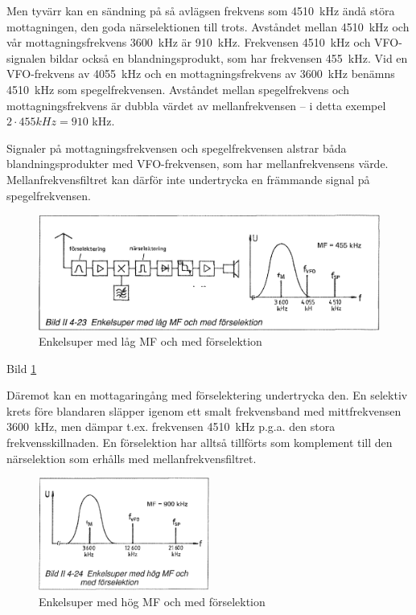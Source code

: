 Men tyvärr kan en sändning på så avlägsen frekvens som 4510~kHz ändå
störa mottagningen, den goda närselektionen till trots. Avståndet
mellan 4510~kHz och vår mottagningsfrekvens 3600~kHz är 910~kHz.
Frekvensen 4510~kHz och VFO-signalen bildar också en
blandningsprodukt, som har frekvensen 455~kHz. Vid en VFO-frekvens av
4055~kHz och en mottagningsfrekvens av 3600~kHz benämns 4510~kHz som
spegelfrekvensen. Avståndet mellan spegelfrekvens och
mottagningsfrekvens är dubbla värdet av mellanfrekvensen -- i detta
exempel \(2 \cdot 455kHz = 910\) kHz.

Signaler på mottagningsfrekvensen och spegelfrekvensen alstrar båda
blandningsprodukter med VFO-frekvensen, som har mellanfrekvensens
värde. Mellanfrekvensfiltret kan därför inte undertrycka en främmande
signal på spegelfrekvensen.

\begin{figure}
  \includegraphics[width=\textwidth]{images/bild_2_4-23}
  \caption{Enkelsuper med låg MF och med förselektion}
  \label{fig:bildII4-23}
\end{figure}

Bild \ref{fig:bildII4-23}

Däremot kan en mottagaringång med förselektering undertrycka den. En
selektiv krets före blandaren släpper igenom ett smalt frekvensband
med mittfrekvensen 3600~kHz, men dämpar t.ex. frekvensen 4510~kHz
p.g.a. den stora frekvensskillnaden. En förselektion har alltså
tillförts som komplement till den närselektion som erhålls med
mellanfrekvensfiltret.

\begin{figure}
  \includegraphics[width=0.5\textwidth]{images/bild_2_4-24}
  \caption{Enkelsuper med hög MF och med förselektion}
  \label{fig:bildII4-24}
\end{figure}

